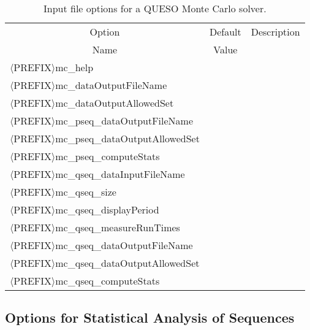 \begin{table}[!h]
\begin{center}
\begin{tabular}{|l|c|c|}
\hline
\multicolumn{1}{|c|}{Option}                            & Default & Description \\
\multicolumn{1}{|c|}{Name}                              & Value   &             \\
\hline
\hline
$\langle$PREFIX$\rangle$mc\_help                        &         &             \\
\hline
$\langle$PREFIX$\rangle$mc\_dataOutputFileName          &         &             \\
\hline
$\langle$PREFIX$\rangle$mc\_dataOutputAllowedSet        &         &             \\
\hline
$\langle$PREFIX$\rangle$mc\_pseq\_dataOutputFileName     &         &             \\
\hline
$\langle$PREFIX$\rangle$mc\_pseq\_dataOutputAllowedSet   &         &             \\
\hline
$\langle$PREFIX$\rangle$mc\_pseq\_computeStats           &         &             \\
\hline
$\langle$PREFIX$\rangle$mc\_qseq\_dataInputFileName      &         &             \\
\hline
$\langle$PREFIX$\rangle$mc\_qseq\_size                   &         &             \\
\hline
$\langle$PREFIX$\rangle$mc\_qseq\_displayPeriod          &         &             \\
\hline
$\langle$PREFIX$\rangle$mc\_qseq\_measureRunTimes        &         &             \\
\hline
$\langle$PREFIX$\rangle$mc\_qseq\_dataOutputFileName     &         &             \\
\hline
$\langle$PREFIX$\rangle$mc\_qseq\_dataOutputAllowedSet   &         &             \\
\hline
$\langle$PREFIX$\rangle$mc\_qseq\_computeStats           &         &             \\
\hline
\end{tabular}
\end{center}
\caption{
Input file options for a QUESO Monte Carlo solver.
}
\label{tab-monte-carlo-options}
\end{table}

\clearpage
\subsection{Options for Statistical Analysis of Sequences}

